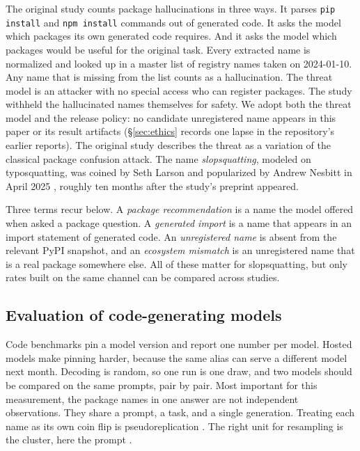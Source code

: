 \documentclass[10pt,twocolumn,letterpaper]{article}
\begin{document}
The original study \citep{spracklen2025package} counts package hallucinations in three ways. It
parses \texttt{pip install} and \texttt{npm install} commands out of generated code. It asks the
model which packages its own generated code requires. And it asks the model which packages would be
useful for the original task. Every extracted name is normalized and looked up in a master list of
registry names taken on 2024-01-10. Any name that is missing from the list counts as a hallucination.
The threat model is an attacker with no special access who can register packages. The study withheld
the hallucinated names themselves for safety. We adopt both the threat model and the release policy:
no candidate unregistered name appears in this paper or its result artifacts
(\S\ref{sec:ethics} records one lapse in the repository's earlier reports). The original study describes
the threat as a variation of the classical package confusion attack. The name
\emph{slopsquatting}, modeled on typosquatting, was coined by Seth Larson and popularized by Andrew
Nesbitt in April 2025 \citep{nesbitt2025slopsquatting,gooding2025slopsquatting}, roughly ten months
after the study's preprint appeared.

Three terms recur below. A \emph{package recommendation} is a name the model offered when asked a
package question. A \emph{generated import} is a name that appears in an import statement of
generated code. An \emph{unregistered name} is absent from the relevant PyPI snapshot, and an
\emph{ecosystem mismatch} is an unregistered name that is a real package somewhere else. All of these
matter for slopsquatting, but only rates built on the same channel can be compared across studies.

\subsection{Evaluation of code-generating models}

Code benchmarks \citep{chen2021codex} pin a model version and report one number per model. Hosted
models make pinning harder, because the same alias can serve a different model next month. Decoding
is random, so one run is one draw, and two models should be compared on the same prompts, pair by
pair. Most important for this measurement, the package names in one answer are not independent
observations. They share a prompt, a task, and a single generation. Treating each name as its own
coin flip is pseudoreplication \citep{hurlbert1984pseudoreplication}. The right unit for resampling is
the cluster, here the prompt \citep{cameron2008bootstrap,efron1993bootstrap}.
\end{document}
